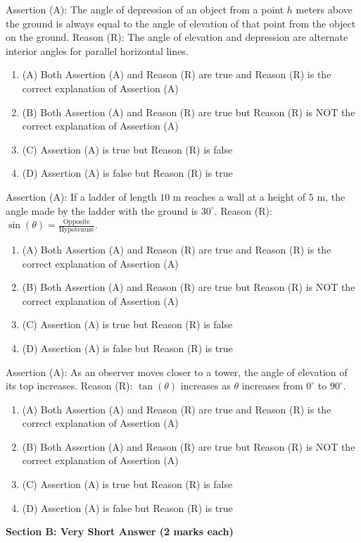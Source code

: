 \documentclass[12pt,a4paper]{exam}
\begin{document}
\begin{questions}
\question[1] Assertion (A): The angle of depression of an object from a point $h$ meters above the ground is always equal to the angle of elevation of that point from the object on the ground. 
Reason (R): The angle of elevation and depression are alternate interior angles for parallel horizontal lines.
\begin{enumerate}[label=(\Alph*)]
  \item (A) Both Assertion (A) and Reason (R) are true and Reason (R) is the correct explanation of Assertion (A)
  \item (B) Both Assertion (A) and Reason (R) are true but Reason (R) is NOT the correct explanation of Assertion (A)
  \item (C) Assertion (A) is true but Reason (R) is false
  \item (D) Assertion (A) is false but Reason (R) is true
\end{enumerate}
\vspace{0.15cm}

\question[1] Assertion (A): If a ladder of length $10 \text{ m}$ reaches a wall at a height of $5 \text{ m}$, the angle made by the ladder with the ground is $30^\circ$. 
Reason (R): $\sin(\theta) = \frac{\text{Opposite}}{\text{Hypotenuse}}$.
\begin{enumerate}[label=(\Alph*)]
  \item (A) Both Assertion (A) and Reason (R) are true and Reason (R) is the correct explanation of Assertion (A)
  \item (B) Both Assertion (A) and Reason (R) are true but Reason (R) is NOT the correct explanation of Assertion (A)
  \item (C) Assertion (A) is true but Reason (R) is false
  \item (D) Assertion (A) is false but Reason (R) is true
\end{enumerate}
\vspace{0.15cm}

\question[1] Assertion (A): As an observer moves closer to a tower, the angle of elevation of its top increases. 
Reason (R): $\tan(\theta)$ increases as $\theta$ increases from $0^\circ$ to $90^\circ$.
\begin{enumerate}[label=(\Alph*)]
  \item (A) Both Assertion (A) and Reason (R) are true and Reason (R) is the correct explanation of Assertion (A)
  \item (B) Both Assertion (A) and Reason (R) are true but Reason (R) is NOT the correct explanation of Assertion (A)
  \item (C) Assertion (A) is true but Reason (R) is false
  \item (D) Assertion (A) is false but Reason (R) is true
\end{enumerate}
\vspace{0.15cm}

\end{questions}
\bigskip
\noindent\textbf{\large Section B: Very Short Answer (2 marks each)}
\end{document}
